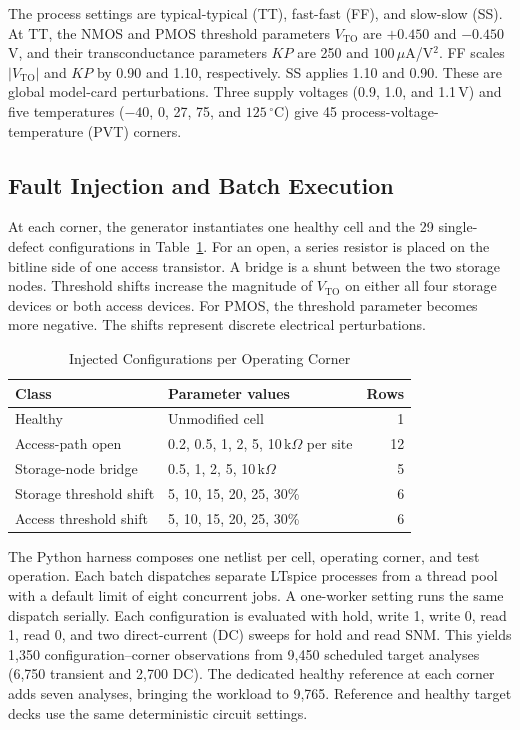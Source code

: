 \documentclass[conference,letterpaper]{IEEEtran}
\begin{document}
The process settings are typical-typical (TT), fast-fast (FF), and slow-slow (SS). At TT, the NMOS and PMOS threshold parameters $V_{\mathrm{TO}}$ are $+0.450$ and $-0.450$\,V, and their transconductance parameters $KP$ are 250 and $100\,\mu$A/V$^2$. FF scales $|V_{\mathrm{TO}}|$ and $KP$ by 0.90 and 1.10, respectively. SS applies 1.10 and 0.90. These are global model-card perturbations. Three supply voltages (0.9, 1.0, and 1.1\,V) and five temperatures ($-40$, 0, 27, 75, and $125\,^{\circ}$C) give 45 process-voltage-temperature (PVT) corners.

\subsection{Fault Injection and Batch Execution}

At each corner, the generator instantiates one healthy cell and the 29 single-defect configurations in Table~\ref{tab:faults}. For an open, a series resistor is placed on the bitline side of one access transistor. A bridge is a shunt between the two storage nodes. Threshold shifts increase the magnitude of $V_{\mathrm{TO}}$ on either all four storage devices or both access devices. For PMOS, the threshold parameter becomes more negative. The shifts represent discrete electrical perturbations.

\begin{table}[!t]
\caption{Injected Configurations per Operating Corner}
\label{tab:faults}
\centering
\footnotesize
\setlength{\tabcolsep}{4pt}
\begin{tabular}{@{}llr@{}}
\toprule
Class & Parameter values & Rows \\
\midrule
Healthy & Unmodified cell & 1 \\
Access-path open & 0.2, 0.5, 1, 2, 5, 10\,k$\Omega$ per site & 12 \\
Storage-node bridge & 0.5, 1, 2, 5, 10\,k$\Omega$ & 5 \\
Storage threshold shift & 5, 10, 15, 20, 25, 30\% & 6 \\
Access threshold shift & 5, 10, 15, 20, 25, 30\% & 6 \\
\bottomrule
\end{tabular}
\end{table}

The Python harness composes one netlist per cell, operating corner, and test operation. Each batch dispatches separate LTspice processes from a thread pool with a default limit of eight concurrent jobs. A one-worker setting runs the same dispatch serially. Each configuration is evaluated with hold, write 1, write 0, read 1, read 0, and two direct-current (DC) sweeps for hold and read SNM. This yields 1,350 configuration--corner observations from 9,450 scheduled target analyses (6,750 transient and 2,700 DC). The dedicated healthy reference at each corner adds seven analyses, bringing the workload to 9,765. Reference and healthy target decks use the same deterministic circuit settings.
\end{document}
